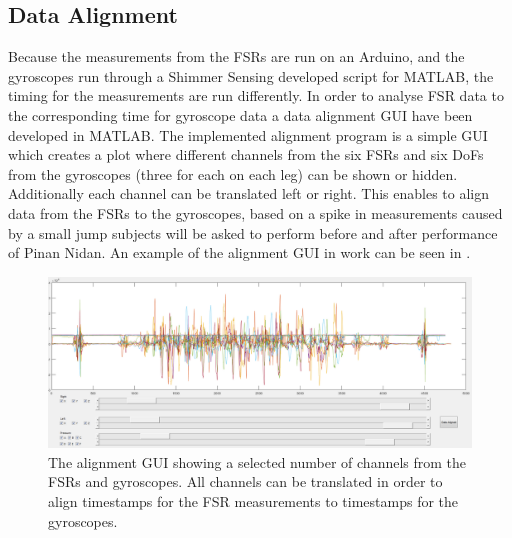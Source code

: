 \subsection{Data Alignment}
Because the measurements from the FSRs are run on an Arduino, and the gyroscopes run through a Shimmer Sensing developed script for MATLAB, the timing for the measurements are run differently. In order to analyse FSR data to the corresponding time for gyroscope data a data alignment GUI have been developed in MATLAB. The implemented alignment program is a simple GUI which creates a plot where different channels from the six FSRs and six DoFs from the gyroscopes (three for each on each leg) can be shown or hidden. Additionally each channel can be translated left or right. This enables to align data from the FSRs to the gyroscopes, based on a spike in measurements caused by a small jump subjects will be asked to perform before and after performance of Pinan Nidan. An example of the alignment GUI in work can be seen in .

\begin{figure}[H]
	\includegraphics[width=1\textwidth]{figures/alignGUI}
	\caption{The alignment GUI showing a selected number of channels from the FSRs and gyroscopes. All channels can be translated in order to align timestamps for the FSR measurements to timestamps for the gyroscopes.}
	\label{fig:alignGUI}  %
\end{figure}

